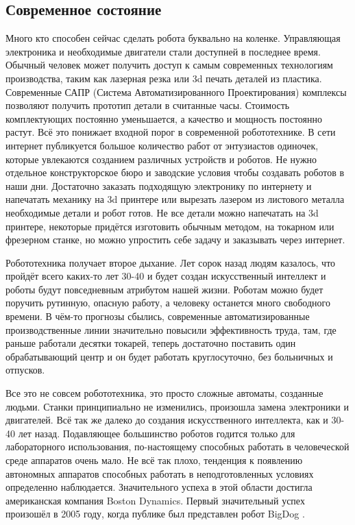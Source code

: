\subsection*{Современное состояние}
Много кто способен сейчас сделать робота буквально на коленке. Управляющая электроника и необходимые двигатели стали доступней в последнее время. Обычный человек может получить доступ к самым современных технологиям производства, таким как лазерная резка или 3d печать деталей из пластика. Современные САПР (Система Автоматизированного Проектирования) комплексы позволяют получить прототип детали в считанные часы. Стоимость комплектующих постоянно уменьшается, а качество и мощность постоянно растут. Всё это понижает входной порог в современной робототехнике. В сети интернет публикуется большое количество работ от энтузиастов одиночек, которые увлекаются созданием различных устройств и роботов. Не нужно отдельное конструкторское бюро и заводские условия чтобы создавать роботов в наши дни. Достаточно заказать подходящую электронику по интернету и напечатать механику на 3d принтере или вырезать лазером из листового металла необходимые детали и робот готов. Не все детали можно напечатать на 3d принтере, некоторые придётся изготовить обычным методом, на токарном или фрезерном станке, но можно упростить себе задачу и заказывать через интернет.

Робототехника получает второе дыхание. Лет сорок назад людям казалось, что пройдёт всего каких-то лет 30-40 и будет создан искусственный интеллект и роботы будут повседневным атрибутом нашей жизни. Роботам можно будет поручить рутинную, опасную работу, а человеку останется много свободного времени. В чём-то прогнозы сбылись, современные автоматизированные производственные линии значительно повысили эффективность труда, там, где раньше работали десятки токарей, теперь достаточно поставить один обрабатывающий центр и он будет работать круглосуточно, без больничных и отпусков.

Все это не совсем робототехника, это просто сложные автоматы, созданные людьми. Станки принципиально не изменились, произошла замена электроники и двигателей. Всё так же далеко до создания искусственного интеллекта, как и 30-40 лет назад. Подавляющее большинство роботов годится только для лабораторного использования, по-настоящему способных работать в человеческой среде аппаратов очень мало. Не всё так плохо, тенденция к появлению автономных аппаратов способных работать в неподготовленных условиях определенно наблюдается. Значительного успеха в этой области достигла американская компания Boston Dynamics. Первый значительный успех произошёл в 2005 году, когда публике был представлен робот BigDog \cite{BigDog}. 

